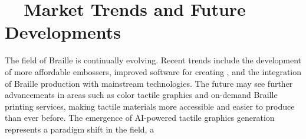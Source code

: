 \section{~~Market Trends and Future Developments}\label{ch4:sec:market-trends}

The field of Braille  is continually evolving. Recent trends include the development of more affordable embossers, improved software for creating , and the integration of Braille production with mainstream technologies.\supercite{DuxburyNews, PerkinsTouchMapper} The future may see further advancements in areas such as color tactile graphics and on-demand Braille printing services, making tactile materials more accessible and easier to produce than ever before. The emergence of AI-powered tactile graphics generation represents a paradigm shift in the field, a

